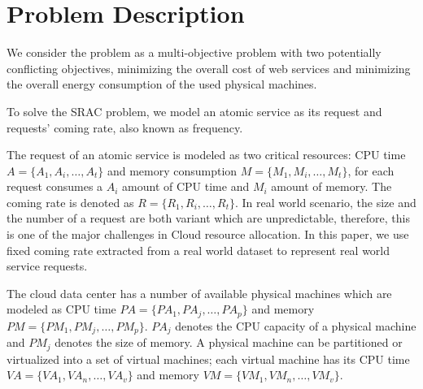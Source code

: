 

\section{Problem Description}
\label{sec:problem}
We consider the problem as a multi-objective problem with two potentially conflicting objectives, 
minimizing the overall cost of web services and minimizing the overall energy consumption of the used physical machines. 

To solve the SRAC problem, we model an atomic service as its request and requests' coming rate, also known as frequency. 


The request of an atomic service is modeled as two critical resources: 
CPU time $A = \{A_1, A_i, \dots, A_t \}$ and 
memory consumption $M = \{M_1, M_i, \dots, M_t \}$, 
for each request consumes a $A_i$ amount of CPU time 
and $M_i$ amount of memory. 
The coming rate is denoted as $R = \{R_1, R_i, \dots, R_t \}$. 
In real world scenario, the size and the number of a request are both variant 
which are unpredictable, therefore, this is one of the major challenges in Cloud resource allocation. 
In this paper, we use fixed coming rate extracted from a real world dataset to represent real world service requests. 
 
The cloud data center has a number of available physical machines which are modeled as
CPU time $PA = \{PA_1, PA_j, \dots, PA_p\}$ and memory
$PM = \{PM_1, PM_j, \dots, PM_p\}$. $PA_j$ denotes the CPU capacity of a physical machine 
and $PM_j$ denotes the size of memory. A physical machine can be partitioned or
 virtualized into a set of virtual machines; 
 each virtual machine has its 
 CPU time $VA = \{VA_1, VA_n, \dots, VA_v\}$ and 
 memory $VM = \{VM_1, VM_n, \dots, VM_v\}$. 


